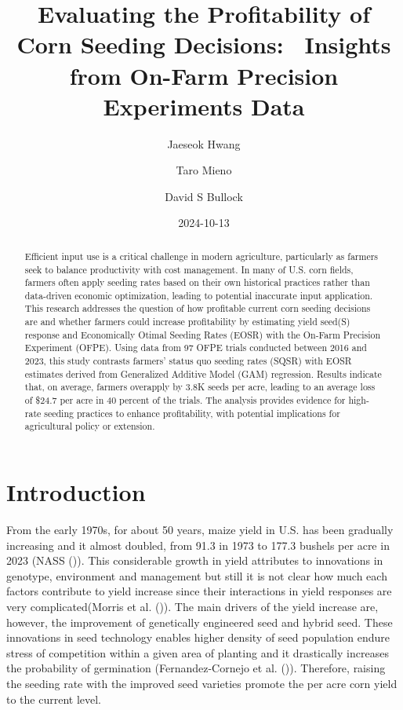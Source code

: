 \documentclass[
]{article}
\title{Evaluating the Profitability of Corn Seeding Decisions: ~Insights
from On-Farm Precision Experiments Data}
\author{Jaeseok Hwang}
\affil{%
                  University of Illinois at Urbana Champaign
              }
\author{Taro Mieno}
\affil{%
                  University of Nebraska-Lincoln
              }
\author{David S Bullock}
\affil{%
                  University of Illinois at Urbana Champaign
              }
\date{2024-10-13}
\begin{document}
\maketitle
\begin{abstract}
Efficient input use is a critical challenge in modern agriculture,
particularly as farmers seek to balance productivity with cost
management. In many of U.S. corn fields, farmers often apply seeding
rates based on their own historical practices rather than data-driven
economic optimization, leading to potential inaccurate input
application. This research addresses the question of how profitable
current corn seeding decisions are and whether farmers could increase
profitability by estimating yield seed(S) response and Economically
Otimal Seeding Rates (EOSR) with the On-Farm Precision Experiment
(OFPE). Using data from 97 OFPE trials conducted between 2016 and 2023,
this study contrasts farmers' status quo seeding rates (SQSR) with EOSR
estimates derived from Generalized Additive Model (GAM) regression.
Results indicate that, on average, farmers overapply by 3.8K seeds per
acre, leading to an average loss of \$24.7 per acre in 40 percent of the
trials. The analysis provides evidence for high-rate seeding practices
to enhance profitability, with potential implications for agricultural
policy or extension.
\end{abstract}


\newpage

\section{Introduction}\label{introduction}

From the early 1970s, for about 50 years, maize yield in U.S. has been
gradually increasing and it almost doubled, from 91.3 in 1973 to 177.3
bushels per acre in 2023 (NASS ()). This
considerable growth in yield attributes to innovations in genotype,
environment and management but still it is not clear how much each
factors contribute to yield increase since their interactions in yield
responses are very complicated(Morris et al.
()). The main drivers of the
yield increase are, however, the improvement of genetically engineered
seed and hybrid seed. These innovations in seed technology enables
higher density of seed population endure stress of competition within a
given area of planting and it drastically increases the probability of
germination (Fernandez-Cornejo et al.
()). Therefore, raising the
seeding rate with the improved seed varieties promote the per acre corn
yield to the current level.
\end{document}
